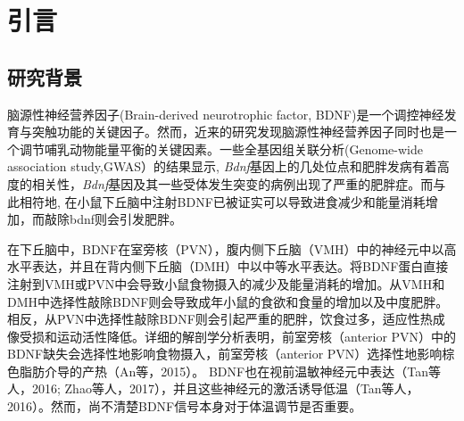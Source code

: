 \chapter{引言}\label{chap:introduction}

\section{研究背景}
脑源性神经营养因子(Brain-derived neurotrophic factor, BDNF)是一个调控神经发育与突触功能的关键因子。然而，近来的研究发现脑源性神经营养因子同时也是一个调节哺乳动物能量平衡的关键因素\cite{xu2016neurotrophic}。一些全基因组关联分析(Genome-wide association study,GWAS）的结果显示, \textit{Bdnf}基因上的几处位点和肥胖发病有着高度的相关性\cite{thorleifsson2009genome,speliotes2010association,wen2012meta}，\textit{Bdnf}基因及其一些受体发生突变的病例出现了严重的肥胖症\cite{gray2006hyperphagia}。而与此相符地, 在小鼠下丘脑中注射BDNF已被证实可以导致进食减少和能量消耗增加\citep{wang2007abrain,wang2007bbrain,wang2010brain,godar2011reduction}，而敲除bdnf则会引发肥胖\citep{xu2003brain, unger2007selective, liao2012dendritically}。

在下丘脑中，BDNF在室旁核（PVN），腹内侧下丘脑（VMH）中的神经元中以高水平表达，并且在背内侧下丘脑（DMH）中以中等水平表达\citep{xu2003brain, unger2007selective, liao2012dendritically, an2015discrete}。将BDNF蛋白直接注射到VMH或PVN中会导致小鼠食物摄入的减少及能量消耗的增加\citep{wang2007abrain,wang2007bbrain,godar2011reduction}。从VMH和DMH中选择性敲除BDNF则会导致成年小鼠的食欲和食量的增加以及中度肥胖\citep{unger2007selective}。相反，从PVN中选择性敲除BDNF则会引起严重的肥胖，饮食过多，适应性热成像受损和运动活性降低\citep{an2015discrete}。详细的解剖学分析表明，前室旁核（anterior PVN）中的BDNF缺失会选择性地影响食物摄入，前室旁核（anterior PVN）选择性地影响棕色脂肪介导的产热（An等，2015）。 BDNF也在视前温敏神经元中表达（Tan等人，2016; Zhao等人，2017），并且这些神经元的激活诱导低温（Tan等人，2016）。然而，尚不清楚BDNF信号本身对于体温调节是否重要。